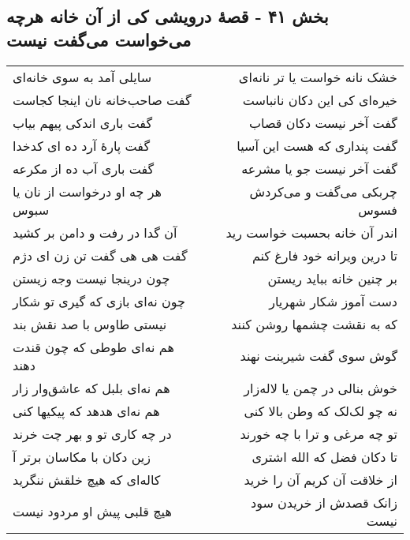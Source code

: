 \begin{center}
\section*{بخش ۴۱ - قصهٔ درویشی کی از آن خانه هرچه می‌خواست می‌گفت نیست}
\label{sec:sh041}
\begin{longtable}{l p{0.5cm} r}
سایلی آمد به سوی خانه‌ای
&&
خشک نانه خواست یا تر نانه‌ای
\\
گفت صاحب‌خانه نان اینجا کجاست
&&
خیره‌ای کی این دکان نانباست
\\
گفت باری اندکی پیهم بیاب
&&
گفت آخر نیست دکان قصاب
\\
گفت پارهٔ آرد ده ای کدخدا
&&
گفت پنداری که هست این آسیا
\\
گفت باری آب ده از مکرعه
&&
گفت آخر نیست جو یا مشرعه
\\
هر چه او درخواست از نان یا سبوس
&&
چربکی می‌گفت و می‌کردش فسوس
\\
آن گدا در رفت و دامن بر کشید
&&
اندر آن خانه بحسبت خواست رید
\\
گفت هی هی گفت تن زن ای دژم
&&
تا درین ویرانه خود فارغ کنم
\\
چون درینجا نیست وجه زیستن
&&
بر چنین خانه بباید ریستن
\\
چون نه‌ای بازی که گیری تو شکار
&&
دست آموز شکار شهریار
\\
نیستی طاوس با صد نقش بند
&&
که به نقشت چشمها روشن کنند
\\
هم نه‌ای طوطی که چون قندت دهند
&&
گوش سوی گفت شیرینت نهند
\\
هم نه‌ای بلبل که عاشق‌وار زار
&&
خوش بنالی در چمن یا لاله‌زار
\\
هم نه‌ای هدهد که پیکیها کنی
&&
نه چو لک‌لک که وطن بالا کنی
\\
در چه کاری تو و بهر چت خرند
&&
تو چه مرغی و ترا با چه خورند
\\
زین دکان با مکاسان برتر آ
&&
تا دکان فضل که الله اشتری
\\
کاله‌ای که هیچ خلقش ننگرید
&&
از خلاقت آن کریم آن را خرید
\\
هیچ قلبی پیش او مردود نیست
&&
زانک قصدش از خریدن سود نیست
\\
\end{longtable}
\end{center}
